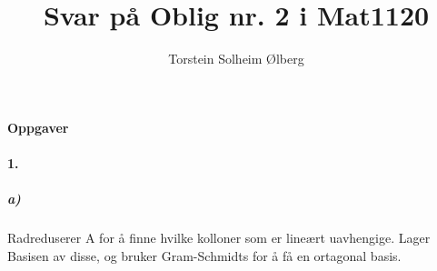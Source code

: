 \documentclass[11pt, A4paper,norsk]{article}
\author{Torstein Solheim Ølberg}
\title{Svar på Oblig nr. 2 i Mat1120}
\begin{document}
\maketitle
	\begin{center}
\Large \textbf{Oppgaver}
	\end{center}









		\paragraph{1.}
			\subparagraph{a)}
				\begin{flushleft}
Radreduserer A for å finne hvilke kolloner som er lineært uavhengige. Lager Basisen av disse, og bruker Gram-Schmidts for å få en ortagonal basis.
				\end{flushleft}
\end{document}
